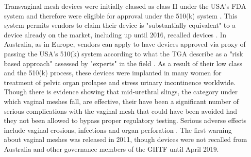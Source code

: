 \documentclass[12pt, openany, oneside]{book}
\begin{document}
Transvaginal mesh devices were initially classed as class II under the USA's FDA  system and therefore were eligible for approval under the 510(k) system \citep{heneghan2017trials}. This system permits vendors to claim their device is "substantially equivalent" to a device already on the market, including up until 2016, recalled devices \citep{ho2014fixing}. In Australia, as in Europe, vendors can apply to have devices approved via proxy of passing the USA's 510(k) system according to what the TGA describe as a "risk based approach" assessed by "experts" in the field \citep{tga}. As a result of their low class and the 510(k) process, these devices were implanted in many women for treatment of pelvic organ prolapse and stress urinary incontinence worldwide. Though there is evidence showing that mid-urethral slings, the category under which vaginal meshes fall, are effective, their have been a significant number of serious complications with the vaginal mesh that could have been avoided had they not been allowed to bypass proper regulatory testing. Serious adverse effects include vaginal erosions, infections and organ perforation \citep{heneghan2017trials}. The first warning about vaginal meshes was released in 2011, though devices were not recalled from Australia and other governance members of the GHTF until April 2019.\\
\end{document}
